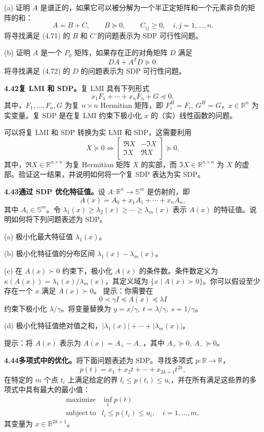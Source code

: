\documentclass[UTF8,12pt,a4paper,fontset=fandol]{ctexart}
\begin{document}
(a) 证明 $A$ 是谱正的，如果它可以被分解为一个半正定矩阵和一个元素非负的矩阵的和：
\[
A=B+C,\qquad B\succeq0,\qquad C_{ij}\geq0,\quad i,j=1,\ldots,n.
\tag{4.71}
\]
将寻找满足 (4.71) 的 $B$ 和 $C$ 的问题表示为 SDP 可行性问题。

(b) 证明 $A$ 是一个 $P_0$ 矩阵，如果存在正的对角矩阵 $D$ 满足
\[
DA+A^TD\succeq0.
\tag{4.72}
\]
将寻找满足 (4.72) 的 $D$ 的问题表示为 SDP 可行性问题。

\noindent\textbf{4.42\quad 复 LMI 和 SDP。}\quad 复 LMI 具有下列形式
\[
x_1F_1+\cdots+x_nF_n+G\preceq0,
\]
其中，$F_1,\ldots,F_n,G$ 为复 $n\times n$ Hermitian 矩阵，即 $F_i^H=F_i,\ G^H=G$，$x\in\mathbb{R}^n$ 为实变量。复 SDP 是在复 LMI 约束下极小化 $x$ 的（实）线性函数的问题。

可以将复 LMI 和 SDP 转换为实 LMI 和 SDP，这需要利用
\[
X\succeq0\Longleftrightarrow
\begin{bmatrix}
\Re X&-\Im X\\
\Im X&\Re X
\end{bmatrix}\succeq0,
\]
其中，$\Re X\in\mathbb{R}^{n\times n}$ 为复 Hermitian 矩阵 $X$ 的实部，而 $\Im X\in\mathbb{R}^{n\times n}$ 为 $X$ 的虚部。验证这一结果，并说明如何将一个复 SDP 表达为实 SDP。

\noindent\textbf{4.43\quad 通过 SDP 优化特征值。}\quad 设 $A:\mathbb{R}^n\to\mathbb{S}^m$ 是仿射的，即
\[
A(x)=A_0+x_1A_1+\cdots+x_nA_n,
\]
其中 $A_i\in\mathbb{S}^m$。令 $\lambda_1(x)\geq\lambda_2(x)\geq\cdots\geq\lambda_m(x)$ 表示 $A(x)$ 的特征值。说明如何将下列问题表述为 SDP。

(a) 极小化最大特征值 $\lambda_1(x)$。

(b) 极小化特征值的分布区间 $\lambda_1(x)-\lambda_m(x)$。

(c) 在 $A(x)\succ0$ 约束下，极小化 $A(x)$ 的条件数。条件数定义为 $\kappa(A(x))=\lambda_1(x)/\lambda_m(x)$，其定义域为 $\{x\mid A(x)\succ0\}$。你可以假设至少存在一个 $x$ 满足 $A(x)\succ0$。
提示：你需要在
\[
0\prec\gamma I\preceq A(x)\preceq\lambda I
\]
约束下极小化 $\lambda/\gamma$。将变量替换为 $y=x/\gamma,\ t=\lambda/\gamma,\ s=1/\gamma$。

(d) 极小化特征值绝对值之和，$|\lambda_1(x)|+\cdots+|\lambda_m(x)|$。

提示：将 $A(x)$ 表示为 $A(x)=A_+-A_-$，其中 $A_+\succeq0,\ A_-\succeq0$。

\noindent\textbf{4.44\quad 多项式中的优化。}\quad 将下面问题表述为 SDP。寻找多项式 $p:\mathbb{R}\to\mathbb{R}$，
\[
p(t)=x_1+x_2t+\cdots+x_{2k+1}t^{2k},
\]
在特定的 $m$ 个点 $t_i$ 上满足给定的界 $l_i\leq p(t_i)\leq u_i$，并在所有满足这些界的多项式中具有最大的最小值：
\[
\begin{array}{ll}
\mathop{\mathrm{maximize}} & \inf_t p(t)\\
\mathrm{subject\ to} & l_i\leq p(t_i)\leq u_i,\quad i=1,\ldots,m,
\end{array}
\]
其变量为 $x\in\mathbb{R}^{2k+1}$。
\end{document}
